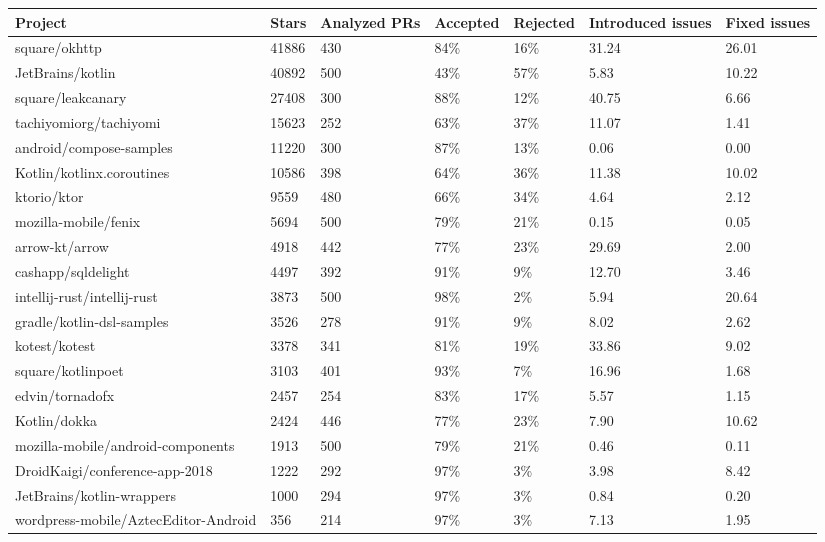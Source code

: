 \begin{tabular}{|p{3.5cm}p{1.5cm}p{1.5cm}p{1.5cm}p{1.5cm}p{1.5cm}p{1cm}|}
  \hline
Project & Stars & Analyzed PRs & Accepted & Rejected & Introduced issues & Fixed issues \\ 
  \hline \hline
square/okhttp & 41886 & 430 & 84\% & 16\% & 31.24 & 26.01 \\ 
  JetBrains/kotlin & 40892 & 500 & 43\% & 57\% & 5.83 & 10.22 \\ 
  square/leakcanary & 27408 & 300 & 88\% & 12\% & 40.75 & 6.66 \\ 
  tachiyomiorg/tachiyomi & 15623 & 252 & 63\% & 37\% & 11.07 & 1.41 \\ 
  android/compose-samples & 11220 & 300 & 87\% & 13\% & 0.06 & 0.00 \\ 
  Kotlin/kotlinx.coroutines & 10586 & 398 & 64\% & 36\% & 11.38 & 10.02 \\ 
  ktorio/ktor & 9559 & 480 & 66\% & 34\% & 4.64 & 2.12 \\ 
  mozilla-mobile/fenix & 5694 & 500 & 79\% & 21\% & 0.15 & 0.05 \\ 
  arrow-kt/arrow & 4918 & 442 & 77\% & 23\% & 29.69 & 2.00 \\ 
  cashapp/sqldelight & 4497 & 392 & 91\% & 9\% & 12.70 & 3.46 \\ 
  intellij-rust/intellij-rust & 3873 & 500 & 98\% & 2\% & 5.94 & 20.64 \\ 
  gradle/kotlin-dsl-samples & 3526 & 278 & 91\% & 9\% & 8.02 & 2.62 \\ 
  kotest/kotest & 3378 & 341 & 81\% & 19\% & 33.86 & 9.02 \\ 
  square/kotlinpoet & 3103 & 401 & 93\% & 7\% & 16.96 & 1.68 \\ 
  edvin/tornadofx & 2457 & 254 & 83\% & 17\% & 5.57 & 1.15 \\ 
  Kotlin/dokka & 2424 & 446 & 77\% & 23\% & 7.90 & 10.62 \\ 
  mozilla-mobile/android-components & 1913 & 500 & 79\% & 21\% & 0.46 & 0.11 \\ 
  DroidKaigi/conference-app-2018 & 1222 & 292 & 97\% & 3\% & 3.98 & 8.42 \\ 
  JetBrains/kotlin-wrappers & 1000 & 294 & 97\% & 3\% & 0.84 & 0.20 \\ 
  wordpress-mobile/AztecEditor-Android & 356 & 214 & 97\% & 3\% & 7.13 & 1.95 \\ 
   \hline
\end{tabular}
